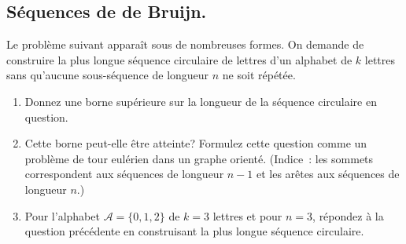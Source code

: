 \subsection{Séquences de de Bruijn.} Le problème suivant apparaît sous de nombreuses formes. On demande de construire la plus longue séquence circulaire de lettres d'un alphabet de $k$ lettres sans qu'aucune sous-séquence de longueur $n$ ne soit répétée.
\begin{enumerate}
  \item Donnez une borne supérieure sur la longueur de la séquence circulaire en question.
  \item Cette borne peut-elle être atteinte? Formulez cette question comme un problème de tour eulérien dans un graphe orienté. (Indice~: les sommets correspondent aux séquences de longueur $n-1$ et les arêtes aux séquences de longueur $n$.)
  \item Pour l'alphabet $\mathcal{A} = \{0, 1, 2\}$ de $k = 3$ lettres et pour $n = 3$, répondez à la question précédente en construisant la plus longue séquence circulaire.
\end{enumerate}
